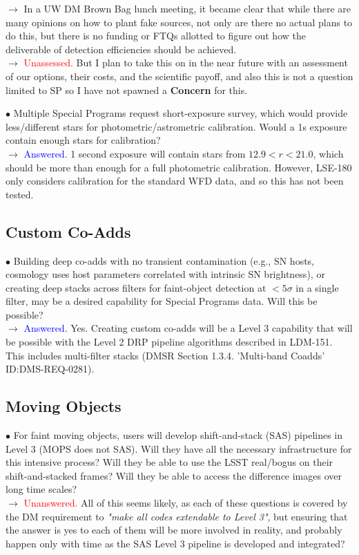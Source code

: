 \documentclass[DM,lsstdraft,toc]{lsstdoc}
\begin{document}
$\rightarrow$ In a UW DM Brown Bag lunch meeting, it became clear that while there are many opinions on how to plant fake sources, not only are there no actual plans to do this, but there is no funding or FTQs allotted to figure out how the deliverable of detection efficiencies should be achieved. \\
$\rightarrow$ \textcolor{red}{Unassessed.} But I plan to take this on in the near future with an assessment of our options, their costs, and the scientific payoff, and also this is not a question limited to SP so I have not spawned a \textbf{Concern} for this.

$\bullet$ Multiple Special Programs request short-exposure survey, which would provide less/different stars for photometric/astrometric calibration. Would a 1s exposure contain enough stars for calibration? \\
$\rightarrow$ \textcolor{blue}{Answered.} 1 second exposure will contain stars from $12.9<r<21.0$, which should be more than enough for a full photometric calibration. However, LSE-180 only considers calibration for the standard WFD data, and so this has not been tested.


\subsection{Custom Co-Adds}\label{ssec:issues_coadds}

$\bullet$ Building deep co-adds with no transient contamination (e.g., SN hosts, cosmology uses host parameters correlated with intrinsic SN brightness), or creating deep stacks across filters for faint-object detection at $<5\sigma$ in a single filter, may be a desired capability for Special Programs data. Will this be possible? \\
$\rightarrow$ \textcolor{blue}{Answered.} Yes. Creating custom co-adds will be a Level 3 capability that will be possible with the Level 2 DRP pipeline algorithms described in LDM-151. This includes multi-filter stacks (DMSR Section 1.3.4. 'Multi-band Coadds' ID:DMS-REQ-0281).


\subsection{Moving Objects}\label{ssec:issues_mops}

$\bullet$ For faint moving objects, users will develop shift-and-stack (SAS) pipelines in Level 3 (MOPS does not SAS). Will they have all the necessary infrastructure for this intensive process? Will they be able to use the LSST real/bogus on their shift-and-stacked frames? Will they be able to access the difference images over long time scales? \\
$\rightarrow$ \textcolor{red}{Unanswered.} All of this seems likely, as each of these questions is covered by the DM requirement to {\it "make all codes extendable to Level 3"}, but ensuring that the answer is yes to each of them will be more involved in reality, and probably happen only with time as the SAS Level 3 pipeline is developed and integrated?
\end{document}
